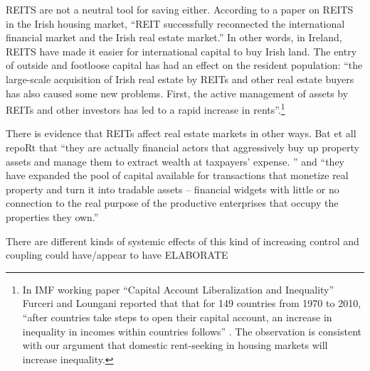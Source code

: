 REITS  are not a neutral tool for saving either. According to a paper \cite{wangAnalyzeImpactREITs2021} on REITS in the Irish housing market, ``REIT successfully reconnected the international financial market and the Irish real estate market.'' In other words, in Ireland, REITS have made it easier for international capital to buy Irish land. The entry of outside and footloose capital has had an effect on the resident population:  ``the large-scale acquisition of Irish real estate by REITs and other real estate buyers has also caused some new problems. First, the active management of assets by REITs and other investors has led to a rapid increase in rents''.\footnote{In  IMF working paper ``Capital Account Liberalization and Inequality'' \cite{furceriCapitalAccountLiberalization2015}  Furceri and Loungani reported that that for 149 countries from 1970 to 2010, ``after countries take steps to open their capital account, an increase in inequality in incomes within countries follows'' . The observation is consistent with our argument  that domestic \gls{rent-seeking} in housing markets will increase inequality.}  

There is evidence that REITs affect real estate markets in other ways. Bat et all  \cite{batRolePublicREITs2022} repoRt that  ``they are actually financial actors that aggressively buy up property assets and manage them to extract wealth at taxpayers’ expense. '' and ``they have expanded the pool of capital available for transactions that monetize real property and turn it into tradable assets – financial widgets with little or no connection to the real purpose of the productive enterprises that occupy the properties they own.''




There are different kinds of systemic effects of this kind of increasing control and coupling could have/appear to have ELABORATE

